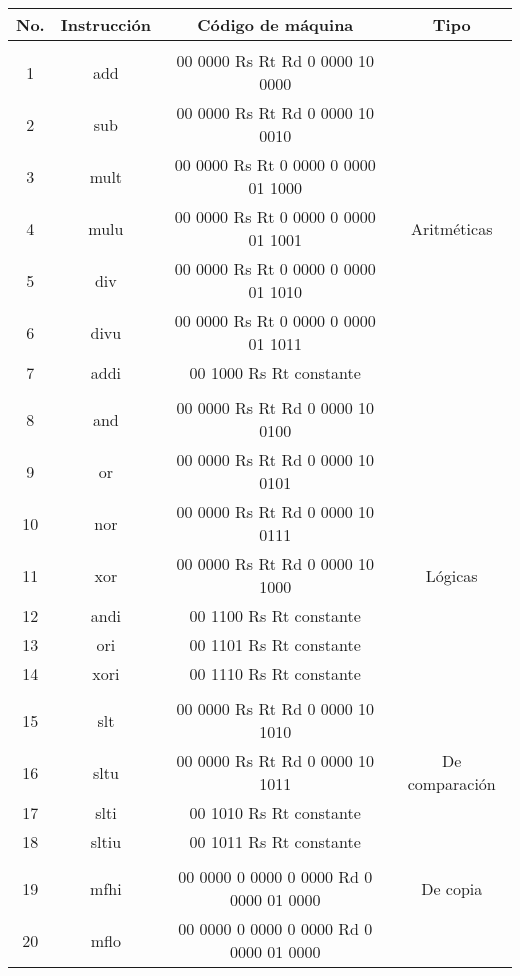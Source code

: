 \documentclass[12pt]{amsart}
\begin{document}
\begin{table}[t]
\begin{center}
\begin{tabular}{  | c | c | c | c | }

\hline
No. & Instrucción & Código de máquina & Tipo\\ \hline

& & & \\
1 & add & 00  0000  Rs  Rt  Rd  0 0000 10 0000 & \\
2 & sub & 00  0000  Rs  Rt  Rd 0 0000 10 0010  &\\
3 & mult & 00  0000  Rs  Rt  0 0000 0 0000 01 1000 &\\
4 & mulu & 00  0000  Rs  Rt  0 0000 0 0000 01 1001 & Aritméticas\\
5 & div &	 00  0000  Rs  Rt  0 0000 0 0000 01 1010 &\\
6 & divu & 00  0000  Rs  Rt  0 0000 0 0000 01 1011 &\\
7 & addi & 00 1000  Rs  Rt  constante &\\ \hline

&& &\\
8 & and &			 	00 0000  Rs  Rt  Rd 0 0000 10 0100 &\\
9 & or &				00 0000  Rs  Rt  Rd 0 0000 10 0101 &\\
10 & nor &				00 0000  Rs  Rt  Rd 0 0000 10 0111 &\\
11 & xor &				00 0000  Rs  Rt  Rd 0 0000 10 1000 & Lógicas\\
12 & andi &			 00 1100  Rs   Rt constante &\\
13 & ori &				 00 1101  Rs   Rt constante &\\
14 & xori &				 00 1110  Rs  Rt constante &\\ \hline

&& & \\
15 & slt &				 00 0000  Rs  Rt  Rd 0 0000 10 1010 &\\
16 & sltu &				 00 0000  Rs  Rt  Rd 0 0000 10 1011 & De comparación\\
17 & slti &				 00 1010  Rs  Rt  constante &\\
18 & sltiu &				 00 1011  Rs Rt constante &\\ \hline

&&\\
19 & mfhi &			 00 0000 0 0000 0 0000 Rd 0 0000 01 0000 & De copia\\
20 & mflo &			 00 0000 0 0000 0 0000 Rd 0 0000 01 0000 &\\ \hline


\end{tabular}
\end{center}
\end{table}
\end{document}
